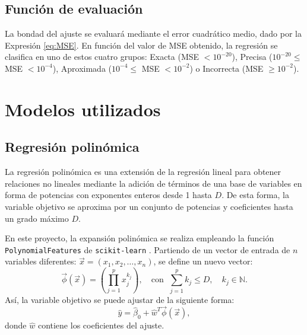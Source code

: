 \documentclass[11pt, a4paper]{article}
\begin{document}
\subsection{Función de evaluación}
\label{subsec:eval}
La bondad del ajuste se evaluará mediante el error cuadrático medio, dado por la Expresión \ref{eq:MSE}. En función del valor de MSE obtenido, la regresión se clasifica en uno de estos cuatro grupos: Exacta (MSE $<10^{-20}$), Precisa ($10^{-20}\leq$ MSE $< 10^{-4}$), Aproximada ($10^{-4}\leq$ MSE $< 10^{-2}$) o Incorrecta (MSE $\geq10^{-2}$).


\section{Modelos utilizados}

\subsection{Regresión polinómica}
La regresión polinómica es una extensión de la regresión lineal para obtener relaciones no lineales mediante la adición de términos de una base de variables en forma de potencias con exponentes enteros desde 1 hasta $D$. De esta forma, la variable objetivo se aproxima por un conjunto de potencias y coeficientes hasta un grado máximo $D$.

En este proyecto, la expansión polinómica se realiza empleando la función \texttt{PolynomialFeatures} de \texttt{scikit-learn} \cite{scikit-learn}. 
Partiendo de un vector de entrada de $n$ variables diferentes: $\vec{x} = (x_1, x_2, \dots, x_n)$, se define un nuevo vector: \vspace{-4mm}
\begin{equation}
\vec{\phi}(\vec{x}) =
\left(\prod_{j=1}^{p} x_j^{k_j}\right), \quad \text{con }\;
\sum_{j=1}^{p} k_j \leq D,
\quad k_j \in \mathbb{N}.
\end{equation}
Así, la variable objetivo se puede ajustar de la siguiente forma:
\begin{equation}
\hat{y}=\hat{\beta}_0+\hat{w}^{T}\vec{\phi}(\vec{x}),
\end{equation}
donde $\hat{w}$ contiene los coeficientes del ajuste.
\end{document}
